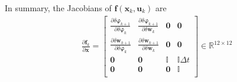In summary, the Jacobians of $\mathbf{f}(\mathbf{x}_k,\mathbf{u}_k)$ are
\begin{align}
\label{eq:df_dx}
&\frac{\partial \mathbf{f}_k}{\partial \mathbf{x}}=
\left[  {\begin{array}{cccc}
	\frac{\partial \delta \boldsymbol{\varphi}_{k+1} } {\partial \delta \boldsymbol{\varphi}_{k} } & \frac{\partial \delta \boldsymbol{\varphi}_{k+1} } {\partial \delta \mathbf{w}_{k} } & \mathbf{0} & \mathbf{0}  \\[1mm]
	\frac{\partial \delta \mathbf{w}_{k+1} } {\partial \delta \boldsymbol{\varphi}_{k} } & \frac{\partial \delta \mathbf{w}_{k+1} } {\partial \delta \mathbf{w}_{k} } & \mathbf{0} & \mathbf{0}  \\[1mm]
	\mathbf{0} & \mathbf{0} & \mathbb{I} & \mathbb{I}\Delta{t}  \\[1mm]
	\mathbf{0} & \mathbf{0} & \mathbf{0} & \mathbb{I}  \\[1mm]
	\end{array} } \right] \in \mathbb{R}^{12 \times 12}
\end{align}

